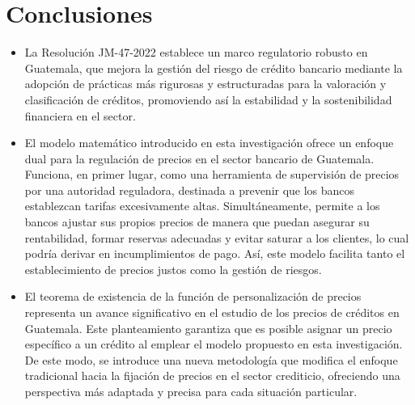 \section{Conclusiones}
\begin{itemize}
    \item La Resolución JM-47-2022 establece un marco regulatorio robusto en Guatemala, que mejora la gestión del riesgo de crédito bancario mediante la adopción de prácticas más rigurosas y estructuradas para la valoración y clasificación de créditos, promoviendo así la estabilidad y la sostenibilidad financiera en el sector.
    \item El modelo matemático introducido en esta investigación ofrece un enfoque dual para la regulación de precios en el sector bancario de Guatemala. Funciona, en primer lugar, como una herramienta de supervisión de precios por una autoridad reguladora, destinada a prevenir que los bancos establezcan tarifas excesivamente altas. Simultáneamente, permite a los bancos ajustar sus propios precios de manera que puedan asegurar su rentabilidad, formar reservas adecuadas y evitar saturar a los clientes, lo cual podría derivar en incumplimientos de pago. Así, este modelo facilita tanto el establecimiento de precios justos como la gestión de riesgos.
    \item El teorema de existencia de la función de personalización de precios representa un avance significativo en el estudio de los precios de créditos en Guatemala. Este planteamiento garantiza que es posible asignar un precio específico a un crédito al emplear el modelo propuesto en esta investigación. De este modo, se introduce una nueva metodología que modifica el enfoque tradicional hacia la fijación de precios en el sector crediticio, ofreciendo una perspectiva más adaptada y precisa para cada situación particular.
\end{itemize}